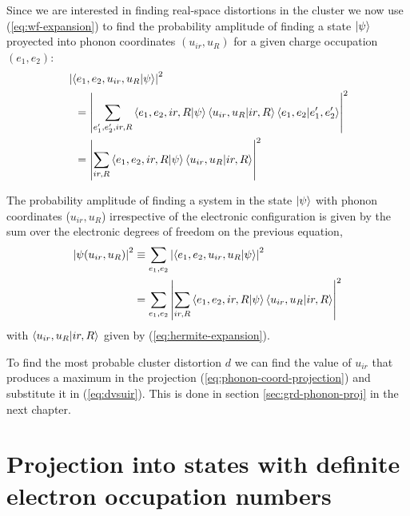 Since we are interested in finding real-space distortions in the cluster we now use (\ref{eq:wf-expansion}) to find the probability amplitude of finding a state $\left | \psi \right\rangle$ proyected into phonon coordinates $(u_{ir},u_R)$ for a given charge occupation $(e_1,e_2)$:
%
\begin{equation}
  \begin{split}
    & \left|\left\langle e_1,e_2,u_{ir},u_R|\psi\right\rangle\right|^2 \\
    & \ \ = \left|\sum_{e_1',e_2',ir,R}\left\langle e_1,e_2,ir,R|\psi\right\rangle\left\langle u_{ir},u_R|ir,R\right\rangle\left\langle e_1,e_2|e_1',e_2'\right\rangle\right|^2 \\
    & \ \ = \left|\sum_{ir,R}\left\langle e_1,e_2,ir,R|\psi\right\rangle\left\langle u_{ir},u_R|ir,R\right\rangle\right|^2
  \end{split}
\end{equation}

The probability amplitude of finding a system in the state $\left | \psi \right\rangle$ with phonon coordinates ($u_{ir},u_R$) irrespective of the electronic configuration is given by the sum over the electronic degrees of freedom on the previous equation,
%
\begin{equation}
  \label{eq:phonon-coord-projection}
  \begin{split}
    \left|\psi(u_{ir}, u_R)\right|^2 & \equiv \sum_{e_1,e_2}\left|\left\langle e_1,e_2,u_{ir},u_R|\psi\right\rangle\right|^2 \\
    & = \sum_{e_1,e_2} \left|\sum_{ir,R}\left\langle e_1,e_2,ir,R|\psi\right\rangle\left\langle u_{ir},u_R|ir,R\right\rangle\right|^2
  \end{split}
\end{equation}
%
with $\left\langle u_{ir},u_R|ir,R\right\rangle$ given by (\ref{eq:hermite-expansion}).

To find the most probable cluster distortion $d$ we can find the value of $u_{ir}$ that produces a maximum in the projection (\ref{eq:phonon-coord-projection}) and substitute it in (\ref{eq:dvsuir}). This is done in section \ref{sec:grd-phonon-proj} in the next chapter.

\section{Projection into states with definite electron occupation numbers}
\label{sec:electronic-projection}

